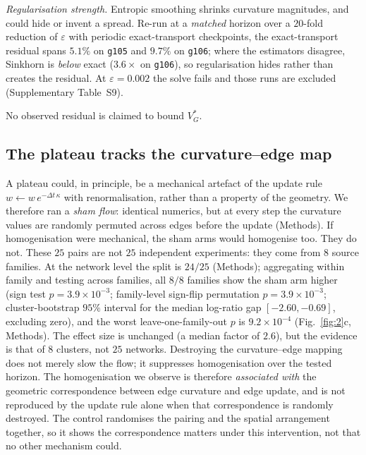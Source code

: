 \documentclass[11pt]{article}
\newcommand{\kappaedge}{\kappa}
\begin{document}
\emph{Regularisation strength.} Entropic smoothing shrinks curvature
magnitudes, and could hide or invent a spread. Re-run at a \emph{matched}
horizon over a $20$-fold reduction of $\varepsilon$ with periodic
exact-transport checkpoints, the exact-transport residual spans $5.1\%$ on
\texttt{g105} and $9.7\%$ on \texttt{g106}; where the estimators disagree,
{Sinkhorn} is \emph{below} exact ($3.6\times$ on \texttt{g106}$\!\!$), so
regularisation hides rather than creates the residual. At
$\varepsilon=0.002$ the solve fails and those runs are excluded
(Supplementary Table~S9).

No observed residual is claimed to bound $V_G^*$.

\subsection*{The plateau tracks the curvature--edge map}

A plateau could, in principle, be a mechanical artefact of the update rule
$w \leftarrow w\,e^{-\Delta t\,\kappaedge}$ with renormalisation, rather than
a property of the geometry. We therefore ran a \emph{sham flow}: identical
numerics, but at every step the curvature values are randomly permuted across
edges before the update (Methods). If homogenisation were mechanical, the sham
arms would homogenise too. They do not. These $25$ pairs are not $25$ independent
experiments: they come from $8$ source families. At the network level the split
is $24/25$ (Methods); aggregating within family and testing across families,
all $8/8$ families show the sham arm higher
(sign test $p = 3.9\times10^{-3}$; family-level sign-flip permutation
$p = 3.9\times10^{-3}$; cluster-bootstrap $95\%$ interval for the median
log-ratio gap $[-2.60, -0.69]$, excluding zero), and the worst
leave-one-family-out $p$ is $9.2\times10^{-4}$
(Fig.~\ref{fig:2}c, Methods). The effect size is unchanged (a median factor
of $2.6$), but the evidence is that of $8$ clusters, not $25$ networks.
Destroying the curvature--edge mapping does not merely slow the flow; it
suppresses homogenisation over the tested horizon. The
homogenisation we observe is therefore \emph{associated with} the geometric
correspondence between edge curvature and edge update, and is not reproduced by
the update rule alone when that correspondence is randomly destroyed. The
control randomises the pairing and the spatial arrangement together, so it
shows the correspondence matters under this intervention, not that no other
mechanism could.
\end{document}
